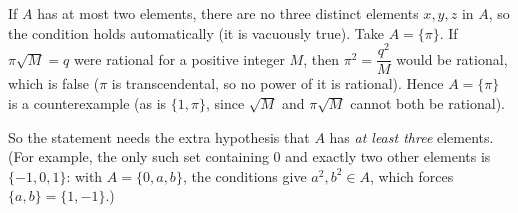 If $A$ has at most two elements, there are no three distinct elements $x,y,z$ in $A$, so the condition holds automatically (it is vacuously true). Take $A=\{\pi\}$. If $\pi\sqrt M=q$ were rational for a positive integer $M$, then $\pi^2=\dfrac{q^2}{M}$ would be rational, which is false ($\pi$ is transcendental, so no power of it is rational). Hence $A=\{\pi\}$ is a counterexample (as is $\{1,\pi\}$, since $\sqrt M$ and $\pi\sqrt M$ cannot both be rational).

So the statement needs the extra hypothesis that $A$ has \emph{at least three} elements. (For example, the only such set containing $0$ and exactly two other elements is $\{-1,0,1\}$: with $A=\{0,a,b\}$, the conditions give $a^2,b^2\in A$, which forces $\{a,b\}=\{1,-1\}$.)

